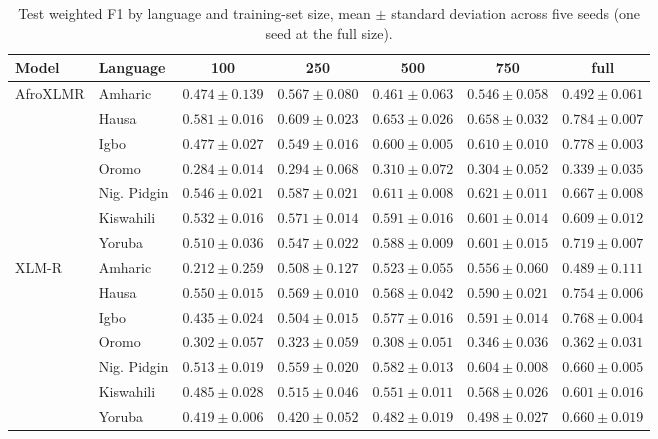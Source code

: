 \begin{table}[t]
\centering
\caption{Test weighted F1 by language and training-set size, mean $\pm$ standard deviation across five seeds (one seed at the full size).}
\label{tab:main_results}
\small
\begin{tabular}{llccccc}
\toprule
Model & Language & 100 & 250 & 500 & 750 & full \\
\midrule
AfroXLMR & Amharic & $0.474 \pm 0.139$ & $0.567 \pm 0.080$ & $0.461 \pm 0.063$ & $0.546 \pm 0.058$ & $0.492 \pm 0.061$ \\
 & Hausa & $0.581 \pm 0.016$ & $0.609 \pm 0.023$ & $0.653 \pm 0.026$ & $0.658 \pm 0.032$ & $0.784 \pm 0.007$ \\
 & Igbo & $0.477 \pm 0.027$ & $0.549 \pm 0.016$ & $0.600 \pm 0.005$ & $0.610 \pm 0.010$ & $0.778 \pm 0.003$ \\
 & Oromo & $0.284 \pm 0.014$ & $0.294 \pm 0.068$ & $0.310 \pm 0.072$ & $0.304 \pm 0.052$ & $0.339 \pm 0.035$ \\
 & Nig. Pidgin & $0.546 \pm 0.021$ & $0.587 \pm 0.021$ & $0.611 \pm 0.008$ & $0.621 \pm 0.011$ & $0.667 \pm 0.008$ \\
 & Kiswahili & $0.532 \pm 0.016$ & $0.571 \pm 0.014$ & $0.591 \pm 0.016$ & $0.601 \pm 0.014$ & $0.609 \pm 0.012$ \\
 & Yoruba & $0.510 \pm 0.036$ & $0.547 \pm 0.022$ & $0.588 \pm 0.009$ & $0.601 \pm 0.015$ & $0.719 \pm 0.007$ \\
\midrule
XLM-R & Amharic & $0.212 \pm 0.259$ & $0.508 \pm 0.127$ & $0.523 \pm 0.055$ & $0.556 \pm 0.060$ & $0.489 \pm 0.111$ \\
 & Hausa & $0.550 \pm 0.015$ & $0.569 \pm 0.010$ & $0.568 \pm 0.042$ & $0.590 \pm 0.021$ & $0.754 \pm 0.006$ \\
 & Igbo & $0.435 \pm 0.024$ & $0.504 \pm 0.015$ & $0.577 \pm 0.016$ & $0.591 \pm 0.014$ & $0.768 \pm 0.004$ \\
 & Oromo & $0.302 \pm 0.057$ & $0.323 \pm 0.059$ & $0.308 \pm 0.051$ & $0.346 \pm 0.036$ & $0.362 \pm 0.031$ \\
 & Nig. Pidgin & $0.513 \pm 0.019$ & $0.559 \pm 0.020$ & $0.582 \pm 0.013$ & $0.604 \pm 0.008$ & $0.660 \pm 0.005$ \\
 & Kiswahili & $0.485 \pm 0.028$ & $0.515 \pm 0.046$ & $0.551 \pm 0.011$ & $0.568 \pm 0.026$ & $0.601 \pm 0.016$ \\
 & Yoruba & $0.419 \pm 0.006$ & $0.420 \pm 0.052$ & $0.482 \pm 0.019$ & $0.498 \pm 0.027$ & $0.660 \pm 0.019$ \\
\bottomrule
\end{tabular}
\end{table}